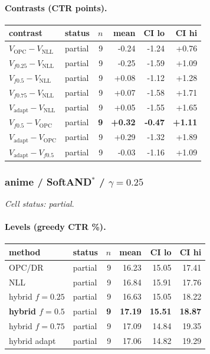 \documentclass[10pt,a4paper]{article}
\begin{document}
\paragraph{Contrasts (CTR points).}
{\centering\small\begin{tabular}{llrrrr}
\toprule contrast & status & $n$ & mean & CI lo & CI hi \\
\midrule
$V_{\mathrm{OPC}}-V_{\mathrm{NLL}}$ & partial & 9 & -0.24 & -1.24 & +0.76 \\
$V_{f0.25}-V_{\mathrm{NLL}}$ & partial & 9 & -0.25 & -1.59 & +1.09 \\
$V_{f0.5}-V_{\mathrm{NLL}}$ & partial & 9 & +0.08 & -1.12 & +1.28 \\
$V_{f0.75}-V_{\mathrm{NLL}}$ & partial & 9 & +0.07 & -1.58 & +1.71 \\
$V_{\mathrm{adapt}}-V_{\mathrm{NLL}}$ & partial & 9 & +0.05 & -1.55 & +1.65 \\
\textbf{$V_{f0.5}-V_{\mathrm{OPC}}$} & partial & \textbf{9} & \textbf{+0.32} & \textbf{-0.47} & \textbf{+1.11} \\
$V_{\mathrm{adapt}}-V_{\mathrm{OPC}}$ & partial & 9 & +0.29 & -1.32 & +1.89 \\
$V_{\mathrm{adapt}}-V_{f0.5}$ & partial & 9 & -0.03 & -1.16 & +1.09 \\
\bottomrule\end{tabular}\par}
\bigskip
\subsubsection{anime / SoftAND$^*$ / $\gamma=0.25$}
\emph{Cell status: partial}.
\paragraph{Levels (greedy CTR \%).}
{\centering\small\begin{tabular}{llrrrr}
\toprule method & status & $n$ & mean & CI lo & CI hi \\
\midrule
OPC/DR & partial & 9 & 16.23 & 15.05 & 17.41 \\
NLL & partial & 9 & 16.84 & 15.91 & 17.76 \\
hybrid $f{=}0.25$ & partial & 9 & 16.63 & 15.05 & 18.22 \\
\textbf{hybrid $f{=}0.5$} & partial & \textbf{9} & \textbf{17.19} & \textbf{15.51} & \textbf{18.87} \\
hybrid $f{=}0.75$ & partial & 9 & 17.09 & 14.84 & 19.35 \\
hybrid adapt & partial & 9 & 17.06 & 14.82 & 19.29 \\
\bottomrule\end{tabular}\par}
\end{document}
